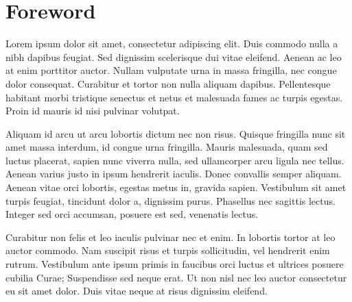 \chapter*{Foreword}

Lorem ipsum dolor sit amet, consectetur adipiscing elit. Duis commodo nulla a nibh dapibus feugiat. Sed dignissim scelerisque dui vitae eleifend. Aenean ac leo at enim porttitor auctor. Nullam vulputate urna in massa fringilla, nec congue dolor consequat. Curabitur et tortor non nulla aliquam dapibus. Pellentesque habitant morbi tristique senectus et netus et malesuada fames ac turpis egestas. Proin id mauris id nisi pulvinar volutpat.

Aliquam id arcu ut arcu lobortis dictum nec non risus. Quisque fringilla nunc sit amet massa interdum, id congue urna fringilla. Mauris malesuada, quam sed luctus placerat, sapien nunc viverra nulla, sed ullamcorper arcu ligula nec tellus. Aenean varius justo in ipsum hendrerit iaculis. Donec convallis semper aliquam. Aenean vitae orci lobortis, egestas metus in, gravida sapien. Vestibulum sit amet turpis feugiat, tincidunt dolor a, dignissim purus. Phasellus nec sagittis lectus. Integer sed orci accumsan, posuere est sed, venenatis lectus. 

Curabitur non felis et leo iaculis pulvinar nec et enim. In lobortis tortor at leo auctor commodo. Nam suscipit risus et turpis sollicitudin, vel hendrerit enim rutrum. Vestibulum ante ipsum primis in faucibus orci luctus et ultrices posuere cubilia Curae; Suspendisse sed neque erat. Ut non nisl nec leo auctor consectetur eu sit amet dolor. Duis vitae neque at risus dignissim eleifend.
